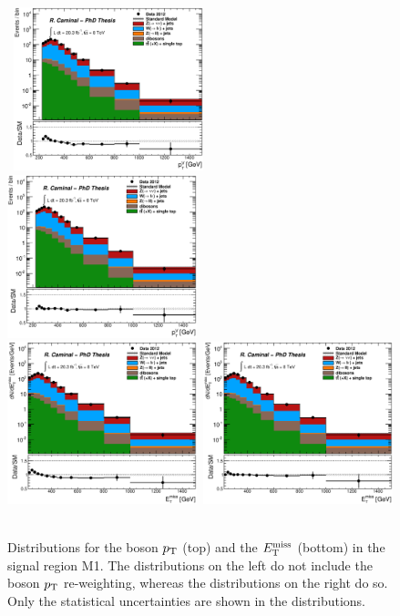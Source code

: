 \begin{figure}
\begin{center}
\mbox{
  \includegraphics[width=0.49\textwidth]{Appendix_BosonPtReweight/Figures/plot_Stop_A6_SR_bosonVec_reco_pt_fitted_NoBosonPtReweight.eps}
  \includegraphics[width=0.49\textwidth]{Appendix_BosonPtReweight/Figures/plot_Stop_A6_SR_bosonVec_reco_pt_fitted_BosonPtReweightApplied.eps}
}
\mbox{
  \includegraphics[width=0.49\textwidth]{Appendix_BosonPtReweight/Figures/plot_Stop_A6_SR_met_fitted_NoBosonPtReweight.eps}
  \includegraphics[width=0.49\textwidth]{Appendix_BosonPtReweight/Figures/plot_Stop_A6_SR_met_fitted_BosonPtReweightApplied.eps}
}
\end{center}
\caption[Distributions for the boson $\pt$ and the $\met$ in the signal region M1.]{
Distributions for the boson $\pt$ (top) and the $\met$ (bottom) in the signal region M1. The distributions on the left do not include the boson $\pt$ re-weighting, whereas the distributions on the right do so. Only the statistical uncertainties are shown in the distributions.}
\label{fig:bosonptwcheck}
\end{figure}
